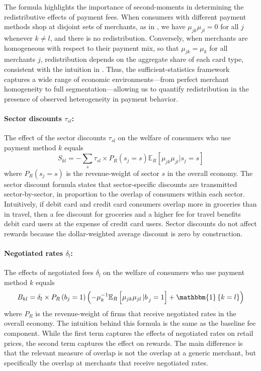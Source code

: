 \documentclass[main.tex]{subfiles}
\begin{document}
The formula highlights the importance of second-moments in determining the redistributive effects of payment fees. 
When consumers with different payment methods shop at disjoint sets of merchants, as in \citet{Gans2018}, we have $\mu_{jk}\mu_{jl}=0$ for all $j$ whenever $k\neq l$, and there is no redistribution.
Conversely, when merchants are homogeneous with respect to their payment mix, so that $\mu_{jk}=\mu_{k}$ for all merchants $j$, redistribution depends on the aggregate share of each card type, consistent with the intuition in \citet{Felt.etal2023}.
Thus, the sufficient-statistics framework captures a wide range of economic environments---from perfect merchant homogeneity to full segmentation---allowing us to quantify redistribution in the presence of observed heterogeneity in payment behavior.

\paragraph{Sector discounts $\tau_{sl}$:}
The effect of the sector discounts $\tau_{sl}$ on the welfare of consumers who use payment method $k$ equals
\begin{equation}
S_{kl}=-\sum_{s}\tau_{sl}\times P_{R}\left(s_{j}=s\right)\mathbb{E}_{R}\left[\mu_{jk}\mu_{jl}\rvert s_{j}=s\right]\label{eq:sector-effect}
\end{equation}
where $P_R(s_j=s)$ is the revenue-weight of sector $s$ in the overall economy.
The sector discount formula states that sector-specific discounts are transmitted sector-by-sector, in proportion to the overlap of consumers within each sector.
Intuitively, if debit card and credit card consumers overlap more in groceries than in travel, then a fee discount for groceries and a higher fee for travel benefits debit card users at the expense of credit card users.
Sector discounts do not affect rewards because the dollar-weighted average discount is zero by construction.

\paragraph{Negotiated rates $\delta_{l}$:}
The effects of negotiated fees $\delta_{l}$ on the welfare of consumers who use payment method $k$ equals
\begin{equation}
B_{kl}=\delta_{l}\times P_{R}\left(b_{j}=1\right)\left(- \mu_k^{-1} \mathbb{E}_{R}\left[\mu_{jk}\mu_{jl}\rvert b_{j}=1\right] + \mathbbm{1}\left\{ k=l\right\}\right)\label{eq:bargain-effect}
\end{equation}
where $P_R$ is the revenue-weight of firms that receive negotiated rates in the overall economy. The intuition behind this formula is the same as the baseline fee component. While the first term captures the effects of negotiated rates on retail prices, the second term captures the effect on rewards. The main difference is that the relevant measure of overlap is not the overlap at a generic merchant, but specifically the overlap at merchants that receive negotiated rates.
\end{document}
